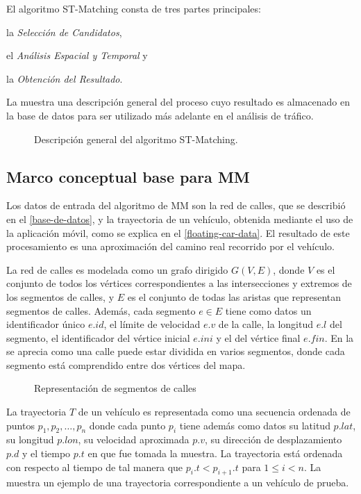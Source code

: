 El algoritmo ST-Matching consta de tres partes principales: \begin{enumerate*}[a)]
\item la \emph{Selección de Candidatos},
\item el \emph{Análisis Espacial y Temporal} y
\item la \emph{Obtención del Resultado}.
\end{enumerate*}
La  muestra una descripción general del proceso cuyo resultado es almacenado en la base de datos para ser utilizado más adelante en el análisis de tráfico.

\begin{figure}[h]
	\centering
	
	\caption[Descripción General de ST-Matching]{Descripción general del algoritmo ST-Matching.}
	\label{fig:st-matching} 
\end{figure}

\subsection{Marco conceptual base para MM}

Los datos de entrada del algoritmo de MM son la red de calles, que se describió en el \cref{base-de-datos}, y la trayectoria de un vehículo, obtenida mediante el uso de la aplicación móvil, como se explica en el \cref{floating-car-data}. El resultado de este procesamiento es una aproximación del camino real recorrido por el vehículo.

La red de calles es modelada como un grafo dirigido $G(V,E)$, donde $V$ es el conjunto de todos los vértices correspondientes a las intersecciones y extremos de los segmentos de calles, y $E$ es el conjunto de todas las aristas que representan segmentos de calles. Además, cada segmento $e \in E$ tiene como datos un identificador único $e.id$, el límite de velocidad $e.v$ de la calle, la longitud $e.l$ del segmento, el identificador del vértice inicial $e.ini$ y el del vértice final $e.fin$. En la  se aprecia como una calle puede estar dividida en varios segmentos, donde cada segmento está comprendido entre dos vértices del mapa.

\begin{figure}[h*]
	\centering
	
	\caption{\label{fig:segmentos_de_calle} Representación de segmentos de calles}	
\end{figure}

La trayectoria $T$ de un vehículo es representada como una secuencia ordenada de puntos $p_1, p_2, \dots, p_n$ donde cada punto $p_i$ tiene además como datos su latitud $p.lat$, su longitud $p.lon$, su velocidad aproximada $p.v$, su dirección de desplazamiento $p.d$ y el tiempo $p.t$ en que fue tomada la muestra. La trayectoria está ordenada con respecto al tiempo de tal manera que $p_i.t < p_{i + 1}.t$ para $1 \le i < n$. La  muestra un ejemplo de una trayectoria correspondiente a un vehículo de prueba.

